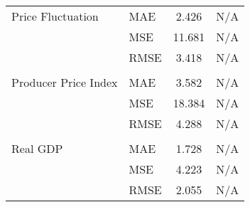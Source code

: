 \documentclass[a4paper,12pt]{article}
\begin{document}
\begin{table}
\begin{tabular}{llcc}
Price Fluctuation & MAE & 2.426 & N/A \\
 & MSE & 11.681 & N/A \\
 & RMSE & 3.418 & N/A \\
\arrayrulecolor{black!30}\midrule &  &  &  \\
Producer Price Index & MAE & 3.582 & N/A \\
 & MSE & 18.384 & N/A \\
 & RMSE & 4.288 & N/A \\
\arrayrulecolor{black!30}\midrule &  &  &  \\
Real GDP & MAE & 1.728 & N/A \\
 & MSE & 4.223 & N/A \\
 & RMSE & 2.055 & N/A \\
\bottomrule
\end{tabular}
\end{table}
\end{document}
